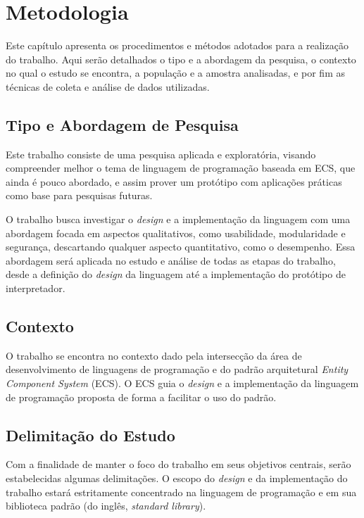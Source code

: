 \chapter{Metodologia}\label{ch:metodologia}

Este capítulo apresenta os procedimentos e métodos adotados para a realização do trabalho. Aqui serão detalhados o tipo e a abordagem da pesquisa, o contexto no qual o estudo se encontra, a população e a amostra analisadas, e por fim as técnicas de coleta e análise de dados utilizadas.

\section{Tipo e Abordagem de Pesquisa}

Este trabalho consiste de uma pesquisa aplicada e exploratória, visando compreender melhor o tema de linguagem de programação baseada em ECS, que ainda é pouco abordado, e assim prover um protótipo com aplicações práticas como base para pesquisas futuras.

O trabalho busca investigar o \textit{design} e a implementação da linguagem com uma abordagem focada em aspectos qualitativos, como usabilidade, modularidade e segurança, descartando qualquer aspecto quantitativo, como o desempenho. Essa abordagem será aplicada no estudo e análise de todas as etapas do trabalho, desde a definição do \textit{design} da linguagem até a implementação do protótipo de interpretador.

\section{Contexto}

O trabalho se encontra no contexto dado pela intersecção da área de desenvolvimento de linguagens de programação e do padrão arquitetural \textit{Entity Component System} (ECS). O ECS guia o \textit{design} e a implementação da linguagem de programação proposta de forma a facilitar o uso do padrão.

\section{Delimitação do Estudo}

Com a finalidade de manter o foco do trabalho em seus objetivos centrais, serão estabelecidas algumas delimitações. O escopo do \textit{design} e da implementação do trabalho estará estritamente concentrado na linguagem de programação e em sua biblioteca padrão (do inglês, \textit{standard library}).

